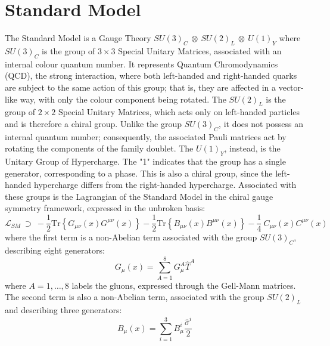 \documentclass[11pt,a4paper,twoside,openright]{report}
\begin{document}
\clearpage

\section{Standard Model}

The Standard Model is a Gauge Theory \(SU(3)_C\ \otimes\ SU(2)_L\ \otimes\ U(1)_Y\) where \(SU(3)_C\) is the group of \(3\times3\) Special Unitary Matrices, associated with an internal colour quantum number. It represents Quantum Chromodynamics (QCD), the strong interaction, where both left-handed and right-handed quarks are subject to the same action of this group; that is, they are affected in a vector-like way, with only the colour component being rotated. The \(SU(2)_L\) is the group of \(2\times2\) Special Unitary Matrices, which acts only on left-handed particles and is therefore a chiral group. Unlike the group \(SU(3)_C\), it does not possess an internal quantum number; consequently, the associated Pauli matrices act by rotating the components of the family doublet. The \(U(1)_Y\), instead, is the Unitary Group of Hypercharge. The "1" indicates that the group has a single generator, corresponding to a phase. This is also a chiral group, since the left-handed hypercharge differs from the right-handed hypercharge. Associated with these groups is the Lagrangian of the Standard Model in the chiral gauge symmetry framework, expressed in the unbroken basis:
\begin{equation}
\mathcal{L}_{SM}\ \supset\ -\frac{1}{2}\mathrm{Tr}\left\{ G_{\mu\nu}(x)G^{\mu\nu}(x) \right\}-\frac{1}{2}\mathrm{Tr}\left\{ B_{\mu\nu}(x)B^{\mu\nu}(x) \right\}-\frac{1}{4}\ C_{\mu\nu}(x)C^{\mu\nu}(x)
\end{equation}
where the first term is a non-Abelian term associated with the group \(SU(3)_C\), describing eight generators:
\begin{equation}
G_\mu(x)=\sum_{A=1}^8 G_\mu^A \hat{T}^A
\end{equation}
where \(A=1,\dots,8\) labels the gluons, expressed through the Gell-Mann matrices. The second term is also a non-Abelian term, associated with the group \(SU(2)_L\) and describing three generators:
\begin{equation}
B_\mu(x)=\sum_{i=1}^3 B_\mu^i \frac{\hat{\sigma}^i}{2}
\end{equation}
\end{document}
